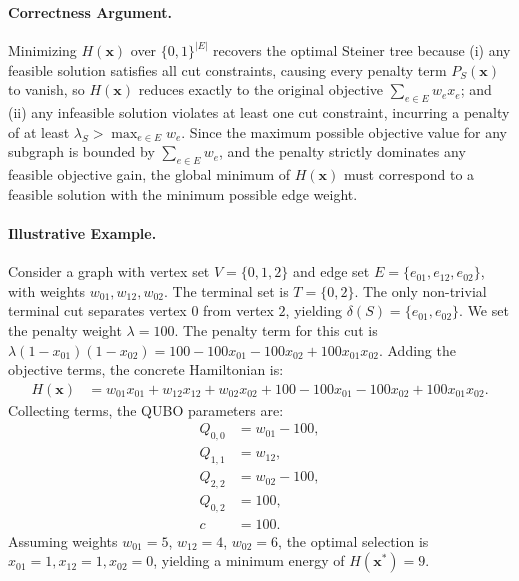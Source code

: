 \documentclass[12pt]{article}
\begin{document}
\paragraph{Correctness Argument.}
Minimizing $H(\mathbf{x})$ over $\{0,1\}^{|E|}$ recovers the optimal Steiner tree because (i) any feasible solution satisfies all cut constraints, causing every penalty term $P_S(\mathbf{x})$ to vanish, so $H(\mathbf{x})$ reduces exactly to the original objective $\sum_{e \in E} w_e x_e$; and (ii) any infeasible solution violates at least one cut constraint, incurring a penalty of at least $\lambda_S > \max_{e \in E} w_e$. Since the maximum possible objective value for any subgraph is bounded by $\sum_{e \in E} w_e$, and the penalty strictly dominates any feasible objective gain, the global minimum of $H(\mathbf{x})$ must correspond to a feasible solution with the minimum possible edge weight.

\paragraph{Illustrative Example.}
Consider a graph with vertex set $V = \{0, 1, 2\}$ and edge set $E = \{e_{01}, e_{12}, e_{02}\}$, with weights $w_{01}, w_{12}, w_{02}$. The terminal set is $T = \{0, 2\}$. The only non-trivial terminal cut separates vertex $0$ from vertex $2$, yielding $\delta(S) = \{e_{01}, e_{02}\}$. We set the penalty weight $\lambda = 100$. The penalty term for this cut is $\lambda(1 - x_{01})(1 - x_{02}) = 100 - 100x_{01} - 100x_{02} + 100x_{01}x_{02}$. Adding the objective terms, the concrete Hamiltonian is:
\begin{align}
H(\mathbf{x}) &= w_{01}x_{01} + w_{12}x_{12} + w_{02}x_{02} + 100 - 100x_{01} - 100x_{02} + 100x_{01}x_{02}.
\end{align}
Collecting terms, the QUBO parameters are:
\begin{align}
Q_{0,0} &= w_{01} - 100, \\
Q_{1,1} &= w_{12}, \\
Q_{2,2} &= w_{02} - 100, \\
Q_{0,2} &= 100, \\
c &= 100.
\end{align}
Assuming weights $w_{01} = 5$, $w_{12} = 4$, $w_{02} = 6$, the optimal selection is $x_{01} = 1, x_{12} = 1, x_{02} = 0$, yielding a minimum energy of $H(\mathbf{x}^*) = 9$.
\end{document}
